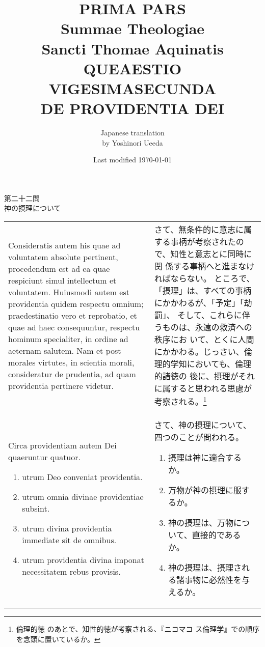 \documentclass[10pt]{jsarticle} %
\title{{\bf PRIMA PARS}\\{\HUGE Summae Theologiae}\\Sancti Thomae
Aquinatis\\{\sffamily QUEAESTIO VIGESIMASECUNDA}\\DE PROVIDENTIA DEI}
\author{Japanese translation\\by Yoshinori {\sc Ueeda}}
\date{Last modified \today}
\begin{document}
\maketitle
\pagestyle{fancy}

\begin{center}
{\Large 第二十二問\\神の摂理について}
\end{center}


\begin{longtable}{p{21em}p{21em}}
Consideratis autem his quae ad voluntatem absolute pertinent,
 procedendum est ad ea quae respiciunt simul intellectum et
 voluntatem. Huiusmodi autem est providentia quidem respectu omnium;
 praedestinatio vero et reprobatio, et quae ad haec consequuntur,
 respectu hominum specialiter, in ordine ad aeternam salutem. Nam et
 post morales virtutes, in scientia morali, consideratur de prudentia,
 ad quam providentia pertinere videtur. 


&

さて、無条件的に意志に属する事柄が考察されたので、知性と意志とに同時に関
 係する事柄へと進まなければならない。
ところで、「摂理」は、すべての事柄にかかわるが、「予定」「劫罰」、
 そして、これらに伴うものは、永遠の救済への秩序にお
 いて、とくに人間にかかわる。じっさい、倫理的学知においても、倫理的諸徳の
 後に、摂理がそれに属すると思われる思慮が考察される。\footnote{倫理的徳
 のあとで、知性的徳が考察される、『ニコマコ
 ス倫理学』での順序を念頭に置いているか。}

\\

Circa providentiam autem Dei
 quaeruntur quatuor. 

\begin{enumerate}
 \item utrum Deo conveniat providentia.
 \item utrum omnia divinae providentiae subsint.
 \item utrum divina providentia immediate sit de omnibus.
 \item utrum providentia divina imponat necessitatem rebus provisis.
\end{enumerate}

&

さて、神の摂理について、四つのことが問われる。

\begin{enumerate}
 \item 摂理は神に適合するか。
 \item 万物が神の摂理に服するか。
 \item 神の摂理は、万物について、直接的であるか。
 \item 神の摂理は、摂理される諸事物に必然性を与えるか。
\end{enumerate}


\end{longtable}
\newpage
\end{document}
